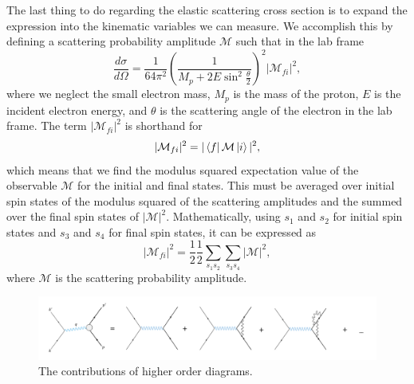 The last thing to do regarding the elastic scattering cross section is to expand the expression into the kinematic variables we can measure. We accomplish this by defining a scattering probability amplitude $\mathcal{M}$ such that in the lab frame
\begin{equation}
\frac{d\sigma}{d\Omega} = \frac{1}{64\pi^2} \left( \frac{1}{M_p + 2E \sin^2 \frac{\theta}{2}} \right)^2 |\mathcal{M}_{fi}|^2,
\end{equation} 
where we neglect the small electron mass, $M_p$ is the mass of the proton, $E$ is the incident electron energy, and $\theta$ is the scattering angle of the electron in the lab frame. The term $|\mathcal{M}_{fi}|^2$ is shorthand for
\begin{equation}
|\mathcal{M}_{fi}|^2 = |\bra{f} \mathcal{M} \ket{i}|^2,
\end{equation}
which means that we find the modulus squared expectation value of the observable $\mathcal{M}$ for the initial and final states. This must be averaged over initial spin states of the modulus squared of the scattering amplitudes and the summed over the final spin states of $|\mathcal{M}|^2$. Mathematically, using $s_1$ and $s_2$ for initial spin states and $s_3$ and $s_4$ for final spin states, it can be expressed as
\begin{equation}
|\mathcal{M}_{fi}|^2 = \frac{1}{2} \frac{1}{2} \sum_{s_1 s_2} \sum_{s_3 s_4} |\mathcal{M}|^2,
\end{equation}
where $\mathcal{M}$ is the scattering probability amplitude. 

\begin{figure}[h!]
	\centering
	\includegraphics[width=\linewidth]{figures/feyn_sum.png}
	\caption{The contributions of higher order diagrams.}
	\label{fig:feyn_sum}
\end{figure}

